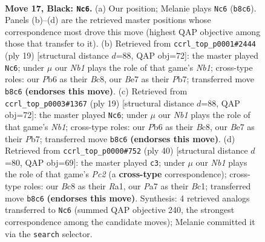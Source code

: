 \documentclass[11pt]{article}
\begin{document}
\begin{figure}[p]
\label{fig:thought-m31}
\end{figure}

\clearpage

\begin{figure}[p]\centering
\begin{subfigure}{0.46\textwidth}\centering
\resizebox{\linewidth}{!}{%
\newchessgame
\chessboard[
  setfen={rnb1kr2/p3b1pp/1p1q4/3p1p1n/1p1P3P/P3PNPB/R3QP2/1NBR2K1 b - - 3 17},
  showmover=false,
  pgfstyle=straightmove, color=movearrow, markmove={b8-c6}
]}
\caption{}
\end{subfigure}\hfill
\begin{subfigure}{0.46\textwidth}\centering
\resizebox{\linewidth}{!}{%
\newchessgame
\chessboard[
  setfen={rnb2rk1/ppq1ppbp/6p1/2p5/2BP4/2P1PN2/P3QPPP/R1B2RK1 b - - 3 10},
  showmover=false,
  pgfstyle=straightmove, color=movearrow, markmove={b8-c6}
]}
\caption{}
\end{subfigure}
\\[4pt]
\begin{subfigure}{0.46\textwidth}\centering
\resizebox{\linewidth}{!}{%
\newchessgame
\chessboard[
  setfen={rnb2rk1/ppq1ppbp/6p1/2p5/2BP4/2P1PN2/P3QPPP/R1B2RK1 b - - 3 10},
  showmover=false,
  pgfstyle=straightmove, color=movearrow, markmove={b8-c6}
]}
\caption{}
\end{subfigure}\hfill
\begin{subfigure}{0.46\textwidth}\centering
\resizebox{\linewidth}{!}{%
\newchessgame
\chessboard[
  setfen={5rk1/2nq1pbp/1r1p1np1/1pp2P2/4P3/3B1N1Q/1PP3PP/R1B2R1K w - - 0 21},
  showmover=false,
  pgfstyle=straightmove, color=movearrow, markmove={c2-c3}
]}
\caption{}
\end{subfigure}
\caption{\textbf{Move 17, Black: \texttt{Nc6}.} (a) Our position; Melanie plays \texttt{Nc6} (\texttt{b8c6}). Panels (b)--(d) are the retrieved master positions whose correspondence most drove this move (highest QAP objective among those that transfer to it). (b) Retrieved from \texttt{ccrl\_top\_p0001\#2444} (ply 19) [structural distance $d$=88, QAP obj=72]: the master played \texttt{Nc6}; under $\mu$ our \emph{Nb1} plays the role of that game's \emph{Nb1}; cross-type roles: our \emph{P}b6 as their \emph{B}c8, our \emph{B}e7 as their \emph{P}b7; transferred move \texttt{b8c6} \textbf{(endorses this move)}. (c) Retrieved from \texttt{ccrl\_top\_p0003\#1367} (ply 19) [structural distance $d$=88, QAP obj=72]: the master played \texttt{Nc6}; under $\mu$ our \emph{Nb1} plays the role of that game's \emph{Nb1}; cross-type roles: our \emph{P}b6 as their \emph{B}c8, our \emph{B}e7 as their \emph{P}b7; transferred move \texttt{b8c6} \textbf{(endorses this move)}. (d) Retrieved from \texttt{ccrl\_top\_p0000\#752} (ply 40) [structural distance $d$=80, QAP obj=69]: the master played \texttt{c3}; under $\mu$ our \emph{Nb1} plays the role of that game's \emph{Pc2} (a \textbf{cross-type} correspondence); cross-type roles: our \emph{B}c8 as their \emph{R}a1, our \emph{P}a7 as their \emph{B}c1; transferred move \texttt{b8c6} \textbf{(endorses this move)}. Synthesis: 4 retrieved analogs transferred to \texttt{Nc6} (summed QAP objective 240, the strongest correspondence among the candidate moves); Melanie committed it via the \texttt{search} selector.}

\end{figure}
\end{document}
